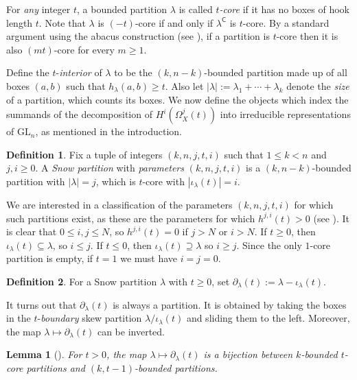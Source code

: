 \documentclass{amsart}
\newcommand\C{\mathsf{C}}
\newcommand\GL{\mathrm{GL}}
\theoremstyle{plain}
\newtheorem{lemma}[lemma]{Lemma}
\theoremstyle{definition}
\newtheorem{definition}[definition]{Definition}
\numberwithin{equation}{section}
\begin{document}
For \emph{any} integer $t$, a bounded partition $\lambda$ is called \emph{$t$-core} if it has no boxes of hook length $t$. Note that $\lambda$ is $(-t)$-core if and only if $\lambda^\C$ is $t$-core. By a standard argument using the abacus construction (see \cite[Theorem 2.7.40]{Gor81}), if a partition is $t$-core then it is also $(mt)$-core for every $m\geq 1$.

Define the $t$-\emph{interior} of $\lambda$ to be the $(k,n-k)$-bounded partition made up of all boxes $(a,b)$ such that $h_\lambda(a,b)\geq t$. Also let $|\lambda|:=\lambda_1+\cdots+\lambda_k$ denote the \emph{size} of a partition, which counts its boxes. We now define the objects which index the summands of the decomposition of $H^i(\Omega_X^j(t))$ into irreducible representations of $\GL_n$, as mentioned in the introduction.

\begin{definition}
Fix a tuple of integers $(k,n,j,t,i)$ such that $1\leq k<n$ and $j,i\geq 0$. A \emph{Snow partition} with \emph{parameters} $(k,n,j,t,i)$ is a $(k,n-k)$-bounded partition with $|\lambda|=j$, which is $t$-core with $|\iota_\lambda(t)|=i$.
\end{definition}

We are interested in a classification of the parameters $(k,n,j,t,i)$ for which such partitions exist, as these are the parameters for which $h^{j,i}(t)>0$ (see ). It is clear that $0\leq i,j\leq N$, so $h^{j,i}(t)=0$ if $j>N$ or $i>N$. If $t\geq 0$, then $\iota_\lambda(t)\subseteq \lambda$, so $i\leq j$. If $t\leq 0$, then $\iota_\lambda(t)\supseteq\lambda$ so $i\geq j$. Since the only $1$-core partition is empty, if $t=1$ we must have $i=j=0$.

\begin{definition}\label{def:delta}
For a Snow partition $\lambda$ with $t\geq 0$, set $\partial_\lambda(t):=\lambda-\iota_\lambda(t)$.
\end{definition}

It turns out that $\partial_\lambda(t)$ is always a partition. It is obtained by taking the boxes in the $t$-\emph{boundary} skew partition $\lambda/\iota_\lambda(t)$ and sliding them to the left. Moreover, the map $\lambda\mapsto\partial_\lambda(t)$ can be inverted.


\begin{lemma}[{\cite[Theorem 7]{Lap04}}]\label{lem:bounded-bijection}
For $t>0$, the map $\lambda\mapsto\partial_\lambda(t)$ is a bijection between $k$-bounded $t$-core partitions and $(k,t-1)$-bounded partitions.
\end{lemma}
\end{document}
